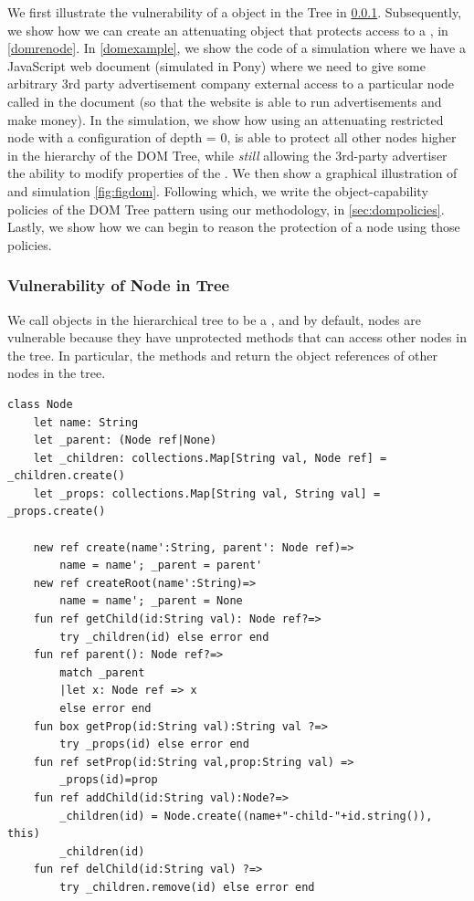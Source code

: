 \documentclass[a4paper,11pt,twoside]{article}
\begin{document}
We first illustrate the vulnerability of a  object in the Tree in \cref{domnode}. Subsequently, we show how we can create an attenuating object  that protects access to a , in \cref{domrenode}. In \cref{domexample}, we show the code of a simulation where we have a JavaScript web document (simulated in Pony) where we need to give some arbitrary 3rd party advertisement company external access to a particular node called  in the document (so that the website is able to run advertisements and make money). In the simulation, we show how using an attenuating restricted node  with a configuration of depth = 0, is able to protect all other nodes higher in the hierarchy of the DOM Tree, while \textit{still} allowing the 3rd-party advertiser the ability to modify properties of the . We then show a graphical illustration of  and  simulation \cref{fig:figdom}. Following which, we write the object-capability policies of the DOM Tree pattern using our methodology, in \cref{sec:dompolicies}. Lastly, we show how we can begin to reason the protection of a node using those policies.

\subsubsection{Vulnerability of Node in Tree}\label{domnode}
We call objects in the hierarchical tree to be a , and by default, nodes are vulnerable because they have unprotected methods that can access other nodes in the tree. In particular, the methods  and  return the object references of other nodes in the tree.
\begin{lstlisting}
class Node
    let name: String
    let _parent: (Node ref|None)
    let _children: collections.Map[String val, Node ref] = _children.create()
    let _props: collections.Map[String val, String val] = _props.create()

    new ref create(name':String, parent': Node ref)=>
        name = name'; _parent = parent'
    new ref createRoot(name':String)=>
        name = name'; _parent = None 
    fun ref getChild(id:String val): Node ref?=>
        try _children(id) else error end
    fun ref parent(): Node ref?=>
        match _parent
        |let x: Node ref => x 
        else error end
    fun box getProp(id:String val):String val ?=>
        try _props(id) else error end
    fun ref setProp(id:String val,prop:String val) =>
        _props(id)=prop
    fun ref addChild(id:String val):Node?=>
        _children(id) = Node.create((name+"-child-"+id.string()), this)
        _children(id)
    fun ref delChild(id:String val) ?=>
        try _children.remove(id) else error end
\end{lstlisting}
\end{document}
